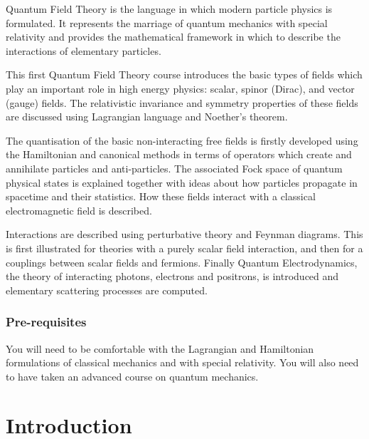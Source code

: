 \documentclass[a4paper]{article}
\begin{document}
\maketitle
{\small
\setlength{\parindent}{0em}
\setlength{\parskip}{1em}

Quantum Field Theory is the language in which modern particle physics is formulated. It represents the marriage of quantum mechanics with special relativity and provides the mathematical framework in which to describe the interactions of elementary particles.

This first Quantum Field Theory course introduces the basic types of fields which play an important role in high energy physics: scalar, spinor (Dirac), and vector (gauge) fields. The relativistic invariance and symmetry properties of these fields are discussed using Lagrangian language and Noether's theorem.

The quantisation of the basic non-interacting free fields is firstly developed using the Hamiltonian and canonical methods in terms of operators which create and annihilate particles and anti-particles. The associated Fock space of quantum physical states is explained together with ideas about how particles propagate in spacetime and their statistics. How these fields interact with a classical electromagnetic field is described.

Interactions are described using perturbative theory and Feynman diagrams. This is first illustrated for theories with a purely scalar field interaction, and then for a couplings between scalar fields and fermions. Finally Quantum Electrodynamics, the theory of interacting photons, electrons and positrons, is introduced and elementary scattering processes are computed.

\subsubsection*{Pre-requisites}
You will need to be comfortable with the Lagrangian and Hamiltonian formulations of classical mechanics and with special relativity. You will also need to have taken an advanced course on quantum mechanics.
}
\tableofcontents

\setcounter{section}{-1}
\section{Introduction}
\end{document}
